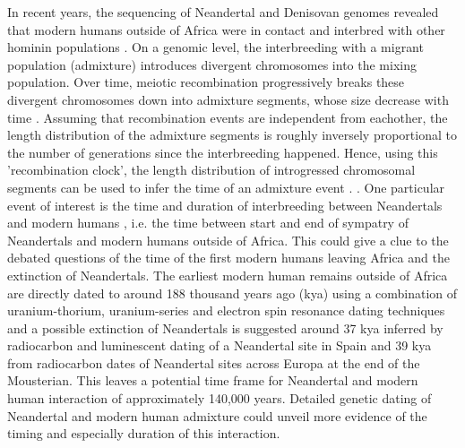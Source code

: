 \documentclass[]{article}
\begin{document}
In recent years, the sequencing of Neandertal \citep{green_draft_2010,prufer_complete_2013,prufer_high-coverage_2017, mafessoni_high_coverage_2020} and Denisovan genomes \citep{reich_genetic_2010, meyer_high-coverage_2012} revealed that modern humans outside of Africa were in contact and interbred with other hominin populations \citep{vernot_resurrecting_2014,fu_genome_2014,fu_early_2015,sankararaman_genomic_2014,sankararaman_combined_2016,vernot_excavating_2016,malaspinas_genomic_2016}. On a genomic level, the interbreeding with a migrant population (admixture) introduces divergent chromosomes into the mixing population. Over time, meiotic recombination progressively breaks these divergent chromosomes down into admixture segments, whose size decrease with time \citep{falush_inference_2003}. Assuming that recombination events are independent from eachother, the length distribution of the admixture segments is roughly inversely proportional to the number of generations since the interbreeding happened. Hence, using this 'recombination clock', the length distribution of introgressed chromosomal segments can be used to infer the time of an
admixture event \citep{moorjani_history_2011,pugach_dating_2011,sankararaman_date_2012,loh_inferring_2013,sankararaman_combined_2016,pugach_gateway_2018,jacobs_multiple_2019,hellenthal_genetic_2014}. \citep{pool_inference_2009,moorjani_history_2011,gravel_population_2012,liang_lengths_2014}. One particular event of interest is the time and duration of interbreeding between Neandertals and modern humans , i.e. the time between start and end of sympatry of Neandertals and modern humans outside of Africa. This could give a clue to the debated questions of the time of the first modern humans leaving Africa and the extinction of Neandertals. The earliest modern human remains outside of Africa are directly dated to around 188 thousand years ago (kya)  using a combination of uranium-thorium, uranium-series and electron spin resonance dating techniques  \citep{stringer_when_2018,hershkovitz_earliest_2018} and a possible extinction of Neandertals is suggested around 37 kya inferred by radiocarbon and luminescent dating of a Neandertal site in Spain \citep{zilhao_precise_2017} and 39 kya from radiocarbon dates of Neandertal sites across Europa \citep{higham_timing_2014} at the end of the Mousterian. This leaves a potential time frame for Neandertal and modern human interaction of approximately 140,000 years. Detailed genetic dating of Neandertal and modern human admixture could unveil more evidence of the timing and especially duration of this interaction. 
\end{document}
